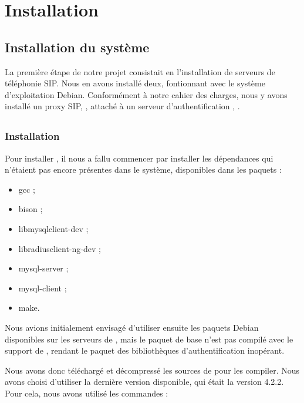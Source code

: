 \section{Installation}

\subsection{Installation du système}


La première étape de notre projet consistait en l’installation de serveurs de téléphonie SIP. Nous en avons installé deux, fontionnant avec le système d’exploitation Debian. Conformément à notre cahier des charges, nous y avons installé un proxy SIP, {\kam}, attaché à un serveur d’authentification {\rad}, {\frad}.

\subsection{\kam}

\subsubsection{Installation}

Pour installer {\kam}, il nous a fallu commencer par installer les dépendances qui n’étaient pas encore présentes dans le système, disponibles dans les paquets :

\begin{itemize}
	\item{gcc} ;
	\item{bison} ;
	\item{libmysqlclient-dev} ;
	\item{libradiusclient-ng-dev} ;
	\item{mysql-server} ;
	\item{mysql-client} ;
	\item{make}.
\end{itemize}

Nous avions initialement envisagé d’utiliser ensuite les paquets Debian disponibles sur les serveurs de {\kam}, mais le paquet de base n’est pas compilé avec le support de {\rad}, rendant le paquet des bibliothèques d’authentification {\rad} inopérant.

Nous avons donc téléchargé et décompressé les sources de {\kam} pour les compiler. Nous avons choisi d’utiliser la dernière version disponible, qui était la version 4.2.2. Pour cela, nous avons utilisé les commandes :

